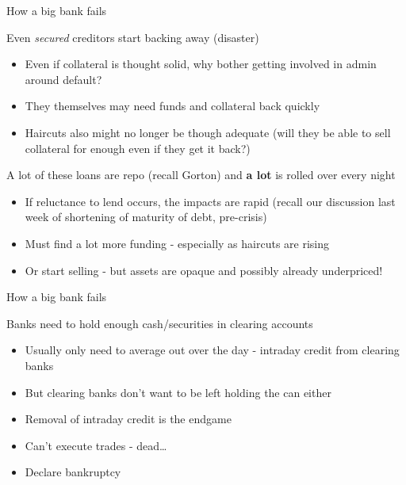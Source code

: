 \begin{frame}{How a big bank fails}

Even \textit{secured} creditors start backing away (disaster)
	\begin{itemize}
	\item	Even if collateral is thought solid, why bother getting involved in admin around default?
	\item	They themselves may need funds and collateral back quickly
	\item	Haircuts also might no longer be though adequate (will they be able to sell collateral for enough even if they get it back?)
	\end{itemize}
\vspace{2mm}
A lot of these loans are repo (recall Gorton) and \textbf{a lot} is rolled over every night
	\begin{itemize}
	\item	If reluctance to lend occurs, the impacts are rapid (recall our discussion last week of shortening of maturity of debt, pre-crisis)
	\item	Must find a lot more funding - especially as haircuts are rising
	\item	Or start selling - but assets are opaque and possibly already underpriced!
	\end{itemize}

\end{frame}



\begin{frame}{How a big bank fails}

Banks need to hold enough cash/securities in clearing accounts
	\begin{itemize}
	\item	Usually only need to average out over the day - intraday credit from clearing banks
	\item	But clearing banks don't want to be left holding the can either
	\item	Removal of intraday credit is the endgame
	\item	Can't execute trades - dead\ldots
	\item	Declare bankruptcy
	\end{itemize}
\end{frame}



